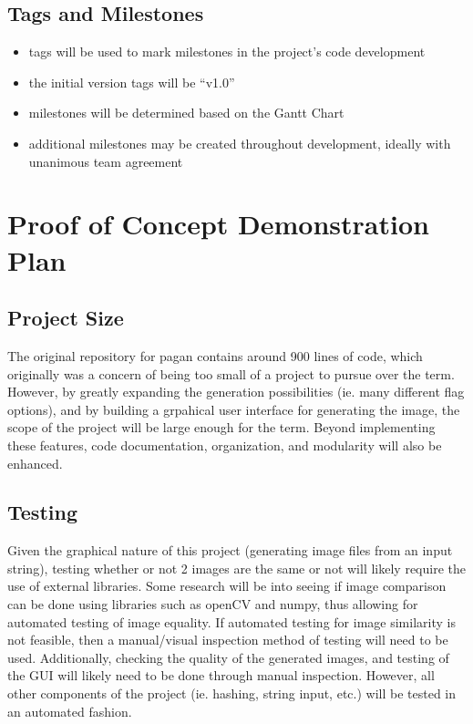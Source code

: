 \documentclass{article}
\begin{document}
\subsection{Tags and Milestones}
\begin{itemize}
  \item tags will be used to mark milestones in the project’s code development
  \item the initial version tags will be “v1.0”
  \item milestones will be determined based on the Gantt Chart
  \item additional milestones may be created throughout development, ideally with unanimous team agreement
\end{itemize}

\section{Proof of Concept Demonstration Plan}
\subsection{Project Size}
The original repository for pagan contains around 900 lines of code, which originally was a concern of being too small of a project to pursue over the term.
However, by greatly expanding the generation possibilities (ie. many different flag options), and by building a grpahical user interface for generating the image, the scope
of the project will be large enough for the term. Beyond implementing these features, code documentation, organization, and modularity will also be enhanced. 
\subsection{Testing}
Given the graphical nature of this project (generating image files from an input string), testing whether or not 2 images are the same or not will likely require the use of external libraries.
Some research will be into seeing if image comparison can be done using libraries such as openCV and numpy, thus allowing for automated testing of image equality. If automated testing for image similarity
is not feasible, then a manual/visual inspection method of testing will need to be used. Additionally, checking the quality of the generated images, and testing of the GUI will likely need to be done through manual inspection.
However, all other components of the project (ie. hashing, string input, etc.) will be tested in an automated fashion.
\end{document}
